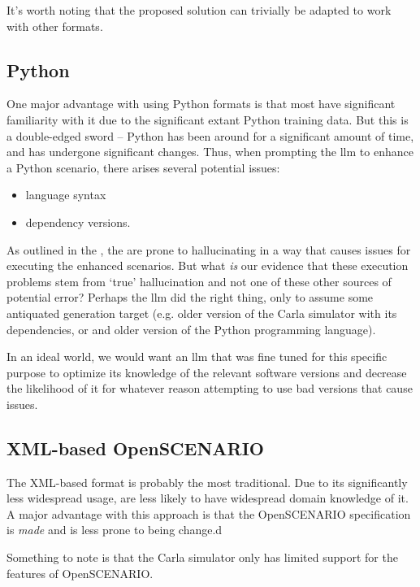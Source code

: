 It's worth noting that the proposed solution can trivially be adapted to work with other formats.

\subsection{Python}

One major advantage with using Python formats is that most  have significant
familiarity with it due to the significant extant Python training data. But this is a double-edged
sword -- Python has been around for a significant amount of time, and has undergone significant
changes. Thus, when prompting the \acrshort{llm} to enhance a Python scenario, there arises several
potential issues: \begin{itemize}
    \item language syntax
    \item dependency versions.
\end{itemize}

As outlined in the , the  are prone to hallucinating in a way that
causes issues for executing the enhanced scenarios. But what \emph{is} our evidence that these
execution problems stem from `true' hallucination and not one of these other sources of potential
error? Perhaps the \acrshort{llm} did the right thing, only to assume some antiquated generation
target (e.g. older version of the Carla simulator with its dependencies, or and older version of the
Python programming language).

In an ideal world, we would want an \acrshort{llm} that was fine tuned for this specific purpose to
optimize its knowledge of the relevant software versions and decrease the likelihood of it for
whatever reason attempting to use bad versions that cause issues.

\subsection{XML-based OpenSCENARIO}

The XML-based format is probably the most traditional. Due to its significantly less widespread
usage,  are less likely to have widespread domain knowledge of it. A major advantage
with this approach is that the OpenSCENARIO specification is \emph{made} and is less prone to being
change.d

Something to note is that the Carla simulator only has limited support for the
features of OpenSCENARIO.

